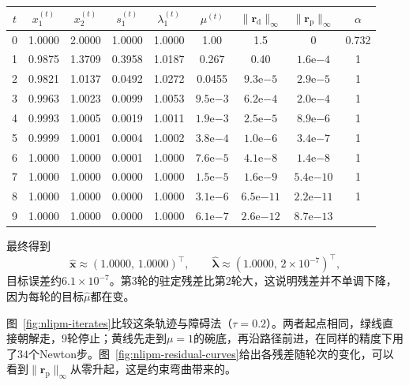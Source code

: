 \begin{BookInlineTable}
  \centering
  \footnotesize
  \begin{tabular}{@{}ccccccccc@{}}
    \toprule
    $t$ & $x_1^{(t)}$ & $x_2^{(t)}$ & $s_1^{(t)}$ & $\lambda_1^{(t)}$ & $\mu^{(t)}$ & $\lVert\bm{r}_{\mathrm{d}}\rVert_\infty$ & $\lVert\bm{r}_{\mathrm{p}}\rVert_\infty$ & $\alpha$\\
    \midrule
    0 & 1.0000 & 2.0000 & 1.0000 & 1.0000 & 1.00 & 1.5 & 0 & 0.732\\
    1 & 0.9875 & 1.3709 & 0.3958 & 1.0187 & 0.267 & 0.40 & $1.6\mathrm{e}{-4}$ & 1\\
    2 & 0.9821 & 1.0137 & 0.0492 & 1.0272 & 0.0455 & $9.3\mathrm{e}{-5}$ & $2.9\mathrm{e}{-5}$ & 1\\
    3 & 0.9963 & 1.0023 & 0.0099 & 1.0053 & $9.5\mathrm{e}{-3}$ & $6.2\mathrm{e}{-4}$ & $2.0\mathrm{e}{-4}$ & 1\\
    4 & 0.9993 & 1.0005 & 0.0019 & 1.0011 & $1.9\mathrm{e}{-3}$ & $2.5\mathrm{e}{-5}$ & $8.9\mathrm{e}{-6}$ & 1\\
    5 & 0.9999 & 1.0001 & 0.0004 & 1.0002 & $3.8\mathrm{e}{-4}$ & $1.0\mathrm{e}{-6}$ & $3.4\mathrm{e}{-7}$ & 1\\
    6 & 1.0000 & 1.0000 & 0.0001 & 1.0000 & $7.6\mathrm{e}{-5}$ & $4.1\mathrm{e}{-8}$ & $1.4\mathrm{e}{-8}$ & 1\\
    7 & 1.0000 & 1.0000 & 0.0000 & 1.0000 & $1.5\mathrm{e}{-5}$ & $1.6\mathrm{e}{-9}$ & $5.4\mathrm{e}{-10}$ & 1\\
    8 & 1.0000 & 1.0000 & 0.0000 & 1.0000 & $3.1\mathrm{e}{-6}$ & $6.5\mathrm{e}{-11}$ & $2.2\mathrm{e}{-11}$ & 1\\
    9 & 1.0000 & 1.0000 & 0.0000 & 1.0000 & $6.1\mathrm{e}{-7}$ & $2.6\mathrm{e}{-12}$ & $8.7\mathrm{e}{-13}$ & \\
    \bottomrule
  \end{tabular}
  \caption{贯穿例的逐轮中间量，$\sigma=0.2$、$\eta=0.9$。第$t$行的$\alpha$是从第$t$个点出发那一轮的步长。全部$\alpha$都未经回溯。}
  \label{tab:nlipm-run}
\end{BookInlineTable}

最终得到
\[
 \hat{\bm{x}}\approx(1.0000,\,1.0000)^\top,\qquad\hat{\bm{\lambda}}\approx(1.0000,\,2\times10^{-7})^\top,
\]
目标误差约$6.1\times10^{-7}$。第$3$轮的驻定残差比第$2$轮大，这说明残差并不单调下降，因为每轮的目标$\hat{\mu}$都在变。

图~\ref{fig:nlipm-iterates}比较这条轨迹与障碍法（$\tau=0.2$）。两者起点相同，绿线直接朝解走，$9$轮停止；黄线先走到$\mu=1$的碗底，再沿路径前进，在同样的精度下用了$34$个Newton步。图~\ref{fig:nlipm-residual-curves}给出各残差随轮次的变化，可以看到$\lVert\bm{r}_{\mathrm{p}}\rVert_\infty$从零升起，这是约束弯曲带来的。

